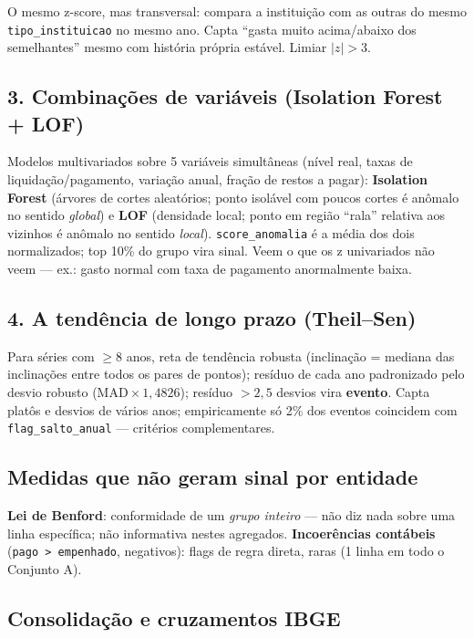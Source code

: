 \documentclass[11pt,a4paper]{article}
\begin{document}
O mesmo z-score, mas transversal: compara a instituição com as outras do
mesmo \texttt{tipo\_instituicao} no mesmo ano. Capta ``gasta muito
acima/abaixo dos semelhantes'' mesmo com história própria estável.
Limiar $|z| > 3$.

\subsection*{3. Combinações de variáveis (Isolation Forest + LOF)}

Modelos multivariados sobre 5 variáveis simultâneas (nível real, taxas de
liquidação/pagamento, variação anual, fração de restos a pagar):
\textbf{Isolation Forest} (árvores de cortes aleatórios; ponto isolável
com poucos cortes é anômalo no sentido \emph{global}) e \textbf{LOF}
(densidade local; ponto em região ``rala'' relativa aos vizinhos é
anômalo no sentido \emph{local}). \texttt{score\_anomalia} é a média dos
dois normalizados; top 10\% do grupo vira sinal. Veem o que os z
univariados não veem --- ex.: gasto normal com taxa de pagamento
anormalmente baixa.

\subsection*{4. A tendência de longo prazo (Theil--Sen)}

Para séries com $\geq 8$ anos, reta de tendência robusta (inclinação =
mediana das inclinações entre todos os pares de pontos); resíduo de cada
ano padronizado pelo desvio robusto ($\mathrm{MAD}\times 1{,}4826$);
resíduo $> 2{,}5$ desvios vira \textbf{evento}. Capta platôs e desvios de
vários anos; empiricamente só 2\% dos eventos coincidem com
\texttt{flag\_salto\_anual} --- critérios complementares.

\subsection*{Medidas que não geram sinal por entidade}

\textbf{Lei de Benford}: conformidade de um \emph{grupo inteiro} --- não
diz nada sobre uma linha específica; não informativa nestes agregados.
\textbf{Incoerências contábeis} (\texttt{pago > empenhado}, negativos):
flags de regra direta, raras (1 linha em todo o Conjunto A).

\subsection*{Consolidação e cruzamentos IBGE}
\end{document}
